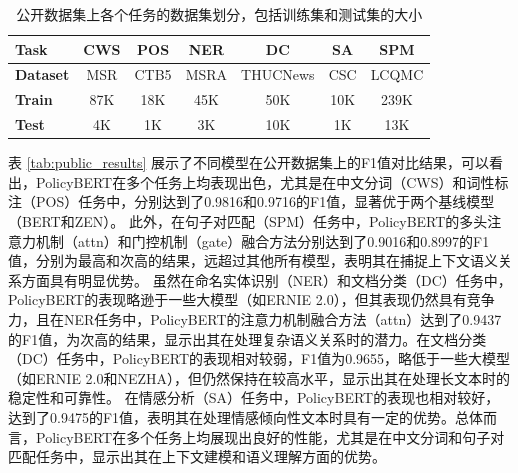 \documentclass[12pt, a4paper]{ctexart}
\begin{document}
\begin{table}[H]
    \renewcommand{\arraystretch}{1}
    \centering
    \caption{公开数据集上各个任务的数据集划分，包括训练集和测试集的大小}
    \begin{tabular}{l|cccccc}
        \toprule
        \textbf{Task} & CWS & POS & NER & DC & SA & SPM\\
        \midrule
        \textbf{Dataset} & MSR & CTB5 & MSRA & THUCNews & CSC & LCQMC\\
        \midrule
        \textbf{Train} & 87K & 18K & 45K & 50K & 10K & 239K \\
        \textbf{Test} & 4K & 1K & 3K & 10K & 1K & 13K \\
        \bottomrule
    \end{tabular}
    \label{tab:public_datasets}
\end{table}

表 \ref{tab:public_results} 展示了不同模型在公开数据集上的F1值对比结果，可以看出，PolicyBERT在多个任务上均表现出色，尤其是在中文分词（CWS）和词性标注（POS）任务中，分别达到了0.9816和0.9716的F1值，显著优于两个基线模型（BERT和ZEN）。
此外，在句子对匹配（SPM）任务中，PolicyBERT的多头注意力机制（attn）和门控机制（gate）融合方法分别达到了0.9016和0.8997的F1值，分别为最高和次高的结果，远超过其他所有模型，表明其在捕捉上下文语义关系方面具有明显优势。
虽然在命名实体识别（NER）和文档分类（DC）任务中，PolicyBERT的表现略逊于一些大模型（如ERNIE 2.0），但其表现仍然具有竞争力，且在NER任务中，PolicyBERT的注意力机制融合方法（attn）达到了0.9437的F1值，为次高的结果，显示出其在处理复杂语义关系时的潜力。在文档分类（DC）任务中，PolicyBERT的表现相对较弱，F1值为0.9655，略低于一些大模型（如ERNIE 2.0和NEZHA），但仍然保持在较高水平，显示出其在处理长文本时的稳定性和可靠性。
在情感分析（SA）任务中，PolicyBERT的表现也相对较好，达到了0.9475的F1值，表明其在处理情感倾向性文本时具有一定的优势。总体而言，PolicyBERT在多个任务上均展现出良好的性能，尤其是在中文分词和句子对匹配任务中，显示出其在上下文建模和语义理解方面的优势。
\end{document}

